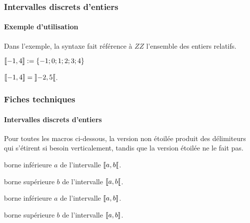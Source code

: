 \documentclass[12pt,a4paper]{article}
\newcommand\ZZ{ZZ}
\newcommand\eqdef{:=}
\begin{document}
\subsubsection{Intervalles discrets d'entiers}

\paragraph{Exemple d'utilisation}

Dans l'exemple, la syntaxe fait référence à $\ZZ$ l'ensemble des entiers relatifs.

\begin{latexex}
 $\ZintervalC{-1}{4} 
  \eqdef
  \{ -1 ; 0 ; 1 ; 2 ; 3 ; 4 \}$
 
 $\ZintervalC{-1}{4} 
= \ZintervalO{-2}{5}$.
\end{latexex}




\subsubsection{Fiches techniques}

\paragraph{Intervalles discrets d'entiers}

Pour toutes les macros ci-dessous, la version non étoilée produit des délimiteurs qui s'étirent si besoin verticalement, tandis que la version étoilée ne le fait pas.


\separation





 borne inférieure $a$ de l'intervalle $\ZintervalCO{a}{b}$.

 borne supérieure $b$ de l'intervalle $\ZintervalCO{a}{b}$.


\separation




 borne inférieure $a$ de l'intervalle $\ZintervalC{a}{b}$.

 borne supérieure $b$ de l'intervalle $\ZintervalC{a}{b}$.


\separation
\end{document}

